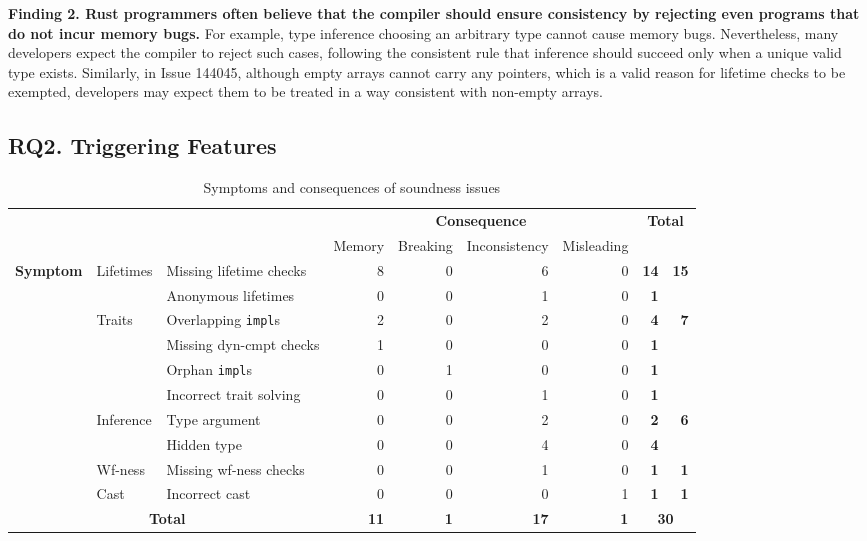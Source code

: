 {\bf Finding 2. Rust programmers often believe that the compiler should ensure
consistency by rejecting even programs that do not incur memory bugs.}
%
For example, type inference choosing an arbitrary type cannot cause memory bugs.
%
Nevertheless, many developers expect the compiler to reject such cases,
following the consistent rule that inference should succeed only when a unique
valid type exists.
%
Similarly, in Issue 144045, although empty arrays cannot carry any pointers,
which is a valid reason for lifetime checks to be exempted, developers may
expect them to be treated in a way consistent with non-empty arrays.

\subsection{RQ2. Triggering Features}

\newcommand{\zero}{{\color{lightgray}0}}
\begin{table}[t]
\caption{Symptoms and consequences of soundness issues}
  \label{tab:symptoms-consequences}
\vspace{-1.1em}
  \renewcommand{\arraystretch}{0.99}
{\scriptsize
\begin{tabular}{l|l|l|r|r|r|r|r|r}
  \multicolumn{3}{c|}{} & \multicolumn{4}{c|}{\bf Consequence} &
  \multicolumn{2}{c}{\multirow{2}{*}{\bf Total}} \\
  \cline{4-7}
  \multicolumn{3}{c|}{} & Memory & Breaking & Inconsistency & Misleading & \multicolumn{2}{c}{} \\
  \hline
  \multirow{9}{*}{\bf Symptom}
  &\multirow{2}{*}{Lifetimes}
  & Missing lifetime checks & 8 & \zero & 6 & \zero & \bf 14 & \multirow{2}{*}{\bf 15} \\
  && Anonymous lifetimes & \zero & \zero & 1 & \zero & \bf 1 \\
  \cline{2-3} \cline{8-9}
  &\multirow{4}{*}{Traits}
  & Overlapping {\tt impl}s & 2 & \zero & 2 & \zero & \bf 4 & \multirow{4}{*}{\bf 7} \\
  && Missing dyn-cmpt checks & 1 & \zero & \zero & \zero & \bf 1 \\
  && Orphan {\tt impl}s & \zero & 1 & \zero & \zero & \bf 1 \\
  && Incorrect trait solving & \zero & \zero & 1 & \zero & \bf 1 \\
  \cline{2-3} \cline{8-9}
  &\multirow{2}{*}{Inference}
  & Type argument & \zero & \zero & 2 & \zero & \bf 2 & \multirow{2}{*}{\bf 6} \\
  && Hidden type & \zero & \zero & 4 & \zero & \bf 4 \\
  \cline{2-3} \cline{8-9}
  &\multirow{1}{*}{Wf-ness}
  & Missing wf-ness checks & \zero & \zero & 1 & \zero & \bf 1 & \multirow{1}{*}{\bf 1} \\
  \cline{2-3} \cline{8-9}
  &\multirow{1}{*}{Cast}
  & Incorrect cast & \zero & \zero & \zero & 1 & \bf 1 & \multirow{1}{*}{\bf 1} \\
  \hline
  \multicolumn{3}{c|}{\bf Total} & \bf 11 & \bf 1 & \bf 17 & \bf 1 & \multicolumn{2}{c}{\bf 30} \\
\end{tabular}
}
\vspace{-0.6em}
\end{table}

